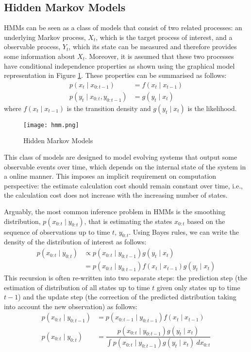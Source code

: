 \subsection{Hidden Markov Models}
HMMs can be seen as a class of models that consist of two related processes: an underlying Markov process, $X_t$, which is the target process of interest, and a observable process, $Y_t$, which its state can be measured and therefore provides some information about $X_t$. Moreover, it is assumed that these two processes have conditional independence properties as shown using the graphical model representation in Figure \ref{fig:HMM}. These properties can be summarised as follows:
\begin{align}
   p(x_t \mid x_{0:t-1}) &= f(x_t \mid x_{t-1})   \nonumber \\
   p(y_t \mid x_{0:t}, y_{0:t-1}) &= g(y_t \mid x_{t}) 
\end{align}
where $f(x_t \mid x_{t-1})$ is the transition density and $g(y_t \mid x_t)$ is the likelihood. 
\begin{figure}
\centering
\texttt{[image: hmm.png]} 
\caption{Hidden Markov Models}
\label{fig:HMM}
\end{figure}

This class of models are designed to model evolving systems that output some observable events over time, which depends on the internal state of the system in a online manner. This imposes an implicit requirement on computation perspective: the estimate calculation cost should remain constant over time, i.e., the calculation cost does not increase with the increasing number of states.

Arguably, the most common inference problem in HMMs is the smoothing distribution, $p(x_{0:t} \mid y_{0:t})$, that is estimating the states $x_{0:t}$ based on the sequence of observations up to time $t$, $y_{0:t}$. Using Bayes rules, we can write the density of the distribution of interest as follows:
\begin{align}
    p(x_{0:t} \mid y_{0:t}) &\propto p(x_{0:t} \mid y_{0:t-1}) g(y_t \mid x_t) \nonumber \\
                            &= p(x_{0:t} \mid y_{0:t-1})f(x_t \mid x_{t-1})g(y_t \mid x_t)
\end{align}
This recursion is often re-written into two separate steps: the prediction step (the estimation of distribution of all states up to time $t$ given only states up to time $t-1$) and the update step (the correction of the predicted distribution taking into account the new observation) as follows:
\begin{align}
  p(x_{0:t} \mid y_{0:t-1}) &= p(x_{0:t-1} \mid y_{0:t-1})f(x_t \mid x_{t-1}) \nonumber \\
  p(x_{0:t} \mid y_{0:t})   &= \dfrac{p(x_{0:t} \mid y_{0:t-1}) g(y_t \mid x_t)}{\displaystyle\int p(x_{0:t} \mid y_{0:t-1}) g(y_t \mid x_t)~dx_{0:t}}
\end{align}

